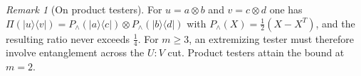 \documentclass[11pt,reqno]{amsart}
\theoremstyle{plain}
\theoremstyle{remark}
\newtheorem{remark}[theorem]{Remark}
\newcommand{\ketbra}[2]{\lvert #1\rangle\!\langle #2\rvert}
\begin{document}
\begin{remark}[On product testers]
For $u=a\otimes b$ and $v=c\otimes d$ one has
$\Pi(\ketbra uv)=P_\wedge(\ketbra ac)\otimes P_\wedge(\ketbra bd)$ with
$P_\wedge(X)=\frac12(X-X^T)$, and the resulting ratio never exceeds $\frac14$.
For $m\ge3$, an extremizing tester must therefore involve entanglement across
the $U:V$ cut. Product testers attain the bound at $m=2$.
\end{remark}
\end{document}
